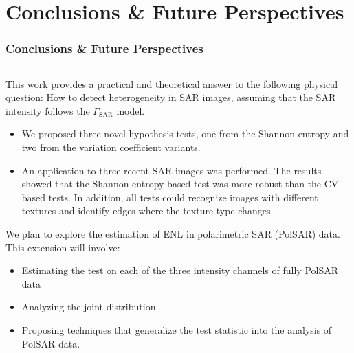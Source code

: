 \documentclass[aspectratio=1610,10pt]{beamer}
\begin{document}
\section{Conclusions \& Future Perspectives}
\begin{frame} 
    \frametitle{\large{Conclusions \& Future Perspectives}}
    \vspace{-0.5cm}

    \justifying
    \begin{columns}[T,onlytextwidth]
        \begin{column}{.99\textwidth}
            \begin{exampleblock}{}\justifying
			This work provides a practical and theoretical answer to the
following physical question: How to detect heterogeneity in SAR images,
assuming that the SAR intensity follows the \(\Gamma_{\text{SAR}}\)
model.   
                \begin{itemize}
                    \item We proposed three novel hypothesis tests, one from
the Shannon entropy and two from the variation coefficient variants.
                    
                    \item An
application to three recent SAR images was performed. The results showed
that the Shannon entropy-based test was more robust than the CV-based
tests. In addition, all tests could recognize images with different
textures and identify edges where the texture type changes.
                \end{itemize}
								\pause
                We plan to explore the estimation of ENL in polarimetric SAR (PolSAR) data. This extension will involve:
\begin{itemize}
	\item Estimating the test on each of the three intensity channels of fully PolSAR data
	\item Analyzing the joint distribution
	\item Proposing techniques that generalize the test statistic  into the analysis of PolSAR data. 
	
\end{itemize}
            \end{exampleblock}
        \end{column}
    \end{columns}
    
    \vspace{0.2cm}
\end{frame}
\end{document}
